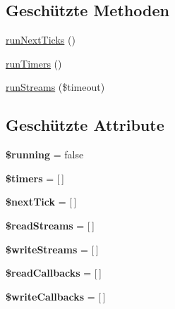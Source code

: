 \subsection*{Geschützte Methoden}
\begin{DoxyCompactItemize}
\item 
\mbox{\hyperlink{class_sabre_1_1_event_1_1_loop_1_1_loop_a0817ff51d002d3a190ca40dd64c21975}{run\+Next\+Ticks}} ()
\item 
\mbox{\hyperlink{class_sabre_1_1_event_1_1_loop_1_1_loop_a94fcec1fcdf17207fc39b24126202a3e}{run\+Timers}} ()
\item 
\mbox{\hyperlink{class_sabre_1_1_event_1_1_loop_1_1_loop_a54c3ac0ed67f872108ea4eff28a80703}{run\+Streams}} (\$timeout)
\end{DoxyCompactItemize}
\subsection*{Geschützte Attribute}
\begin{DoxyCompactItemize}
\item 
\mbox{\label{class_sabre_1_1_event_1_1_loop_1_1_loop_a85a8ab7da5b96a97d92b8bddd619d959}} 
{\bfseries \$running} = false
\item 
\mbox{\label{class_sabre_1_1_event_1_1_loop_1_1_loop_a3c9a04639409c31df4959e0c1085f150}} 
{\bfseries \$timers} = \mbox{[}$\,$\mbox{]}
\item 
\mbox{\label{class_sabre_1_1_event_1_1_loop_1_1_loop_a74ee38d3ced27ec6770caefe0c94550a}} 
{\bfseries \$next\+Tick} = \mbox{[}$\,$\mbox{]}
\item 
\mbox{\label{class_sabre_1_1_event_1_1_loop_1_1_loop_a917eaae391f601aa4e4c504097702cc8}} 
{\bfseries \$read\+Streams} = \mbox{[}$\,$\mbox{]}
\item 
\mbox{\label{class_sabre_1_1_event_1_1_loop_1_1_loop_ae95184627d8d9487069129527a1c16ac}} 
{\bfseries \$write\+Streams} = \mbox{[}$\,$\mbox{]}
\item 
\mbox{\label{class_sabre_1_1_event_1_1_loop_1_1_loop_a3818c205943b50f9d42c1481f1a9cd2b}} 
{\bfseries \$read\+Callbacks} = \mbox{[}$\,$\mbox{]}
\item 
\mbox{\label{class_sabre_1_1_event_1_1_loop_1_1_loop_a059ca18d95717dec560375f86d4fbe36}} 
{\bfseries \$write\+Callbacks} = \mbox{[}$\,$\mbox{]}
\end{DoxyCompactItemize}


